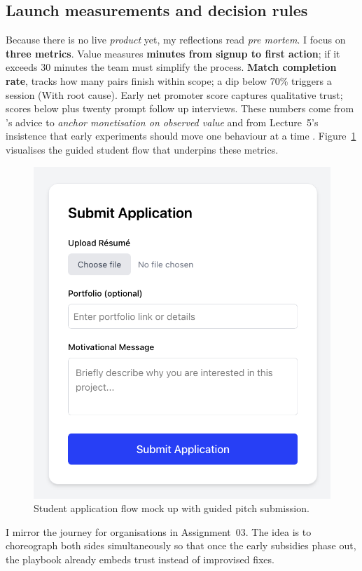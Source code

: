 \subsection*{Launch measurements and decision rules}
Because there is no live \textit{product} yet, my reflections read \textit{pre mortem}. I focus on \textbf{three metrics}. Value measures \textbf{minutes from signup to first action}; if it exceeds 30 minutes the team must simplify the process. \textbf{Match completion rate}, tracks how many pairs finish within scope; a dip below 70\% triggers a session (With root cause). Early net promoter score captures qualitative trust; scores below plus twenty prompt follow up interviews. These numbers come from \citet{ShapiroVarian1999}'s advice to \textit{anchor monetisation on observed value} and from Lecture~5's insistence that early experiments should move one behaviour at a time \citep{Lecture05}. Figure~\ref{fig:application-flow} visualises the guided student flow that underpins these metrics.

\begin{figure}[H]
  \centering
  \includegraphics[width=0.85\linewidth]{figures/Student-Submission.png}
  \caption{Student application flow mock up with guided pitch submission.}
  \label{fig:application-flow}
\end{figure}

I mirror the journey for organisations in Assignment~03. The idea is to choreograph both sides simultaneously so that once the early subsidies phase out, the playbook already embeds trust instead of improvised fixes.
